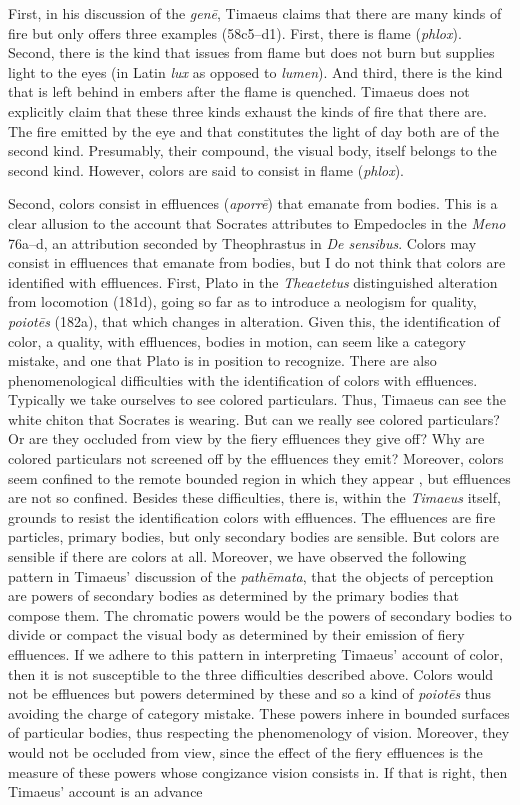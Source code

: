 First, in his discussion of the \emph{genē}, Timaeus claims that there are many kinds of fire but only offers three examples (58c5--d1). First, there is flame (\emph{phlox}). Second, there is the kind that issues from flame but does not burn but supplies light to the eyes (in Latin \emph{lux} as opposed to \emph{lumen}). And third, there is the kind that is left behind in embers after the flame is quenched. Timaeus does not explicitly claim that these three kinds exhaust the kinds of fire that there are. The fire emitted by the eye and that constitutes the light of day both are of the second kind. Presumably, their compound, the visual body, itself belongs to the second kind. However, colors are said to consist in flame (\emph{phlox}).

Second, colors consist in effluences (\emph{aporrē}) that emanate from bodies. This is a clear allusion to the account that Socrates attributes to Empedocles in the \emph{Meno} 76a--d, an attribution seconded by Theophrastus in \emph{De sensibus}. Colors may consist in effluences that emanate from bodies, but I do not think that colors are identified with effluences. First, Plato in the \emph{Theaetetus} distinguished alteration from locomotion (181d), going so far as to introduce a neologism for quality, \emph{poiotēs} (182a), that which changes in alteration. Given this, the identification of color, a quality, with effluences, bodies in motion, can seem like a category mistake, and one that Plato is in position to recognize. There are also phenomenological difficulties with the identification of colors with effluences. Typically we take ourselves to see colored particulars. Thus, Timaeus can see the white chiton that Socrates is wearing. But can we really see colored particulars? Or are they occluded from view by the fiery effluences they give off? Why are colored particulars not screened off by the effluences they emit? Moreover, colors seem confined to the remote bounded region in which they appear \citep{Broad:1952kx}, but effluences are not so confined. Besides these difficulties, there is, within the \emph{Timaeus} itself, grounds to resist the identification colors with effluences. The effluences are fire particles, primary bodies, but only secondary bodies are sensible. But colors are sensible if there are colors at all. Moreover, we have observed the following pattern in Timaeus' discussion of the \emph{pathēmata}, that the objects of perception are powers of secondary bodies as determined by the primary bodies that compose them. The chromatic powers would be the powers of secondary bodies to divide or compact the visual body as determined by their emission of fiery effluences. If we adhere to this pattern in interpreting Timaeus' account of color, then it is not susceptible to the three difficulties described above. Colors would not be effluences but powers determined by these and so a kind of \emph{poiotēs} thus avoiding the charge of category mistake. These powers inhere in bounded surfaces of particular bodies, thus respecting the phenomenology of vision. Moreover, they would not be occluded from view, since the effect of the fiery effluences is the measure of these powers whose congizance vision consists in. If that is right, then Timaeus' account is an advance 